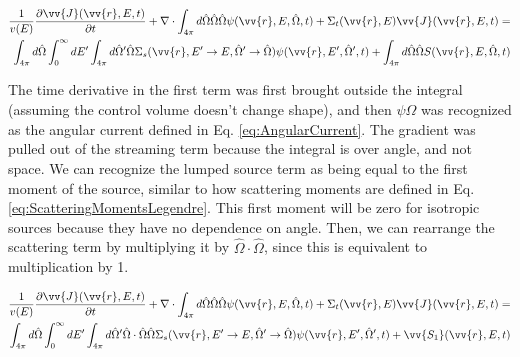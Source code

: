 \documentclass[10pt]{article}
\begin{document}
\begin{flushleft}
\begin{equation}
\label{eq:TEAngleAngleIntegrated}
\begin{aligned}
\frac{1}{v(E)} \frac{\partial\vv{J}(\vv{r}, E, t)}{\partial t} +
 \nabla\cdot \int_{4\pi}^{} d\hat{\Omega}\hat{\Omega}\hat{\Omega}\psi(\vv{r}, E, \hat{\Omega},t) + 
 \Sigma_t(\vv{r},E)\vv{J}(\vv{r}, E, t) = \\
 \int_{4\pi}^{} d\hat{\Omega} \int_{0}^{\infty}dE' \int_{4\pi}^{ } d\hat{\Omega}' \hat{\Omega}\Sigma_s(\vv{r}, E'\rightarrow E, \hat{\Omega}'\rightarrow\hat{\Omega})\psi(\vv{r}, E', \hat{\Omega}',t) + \int_{4\pi}^{} d\hat{\Omega}\hat{\Omega}S(\vv{r}, E, \hat{\Omega}, t)\\
\end{aligned}
\end{equation}

The time derivative in the first term was first brought outside the integral (assuming the control volume doesn't change shape), and then \(\psi\hat{\Omega}\) was recognized as the angular current defined in Eq. \ref{eq:AngularCurrent}. The gradient was pulled out of the streaming term because the integral is over angle, and not space. We can recognize the lumped source term as being equal to the first moment of the source, similar to how scattering moments are defined in Eq. \ref{eq:ScatteringMomentsLegendre}. This first moment will be zero for isotropic sources because they have no dependence on angle. Then, we can rearrange the scattering term by multiplying it by \(\hat{\Omega}\cdot\hat{\Omega}\), since this is equivalent to multiplication by 1.

\begin{equation}
\label{eq:TEAngleAngleIntegrated}
\begin{aligned}
\frac{1}{v(E)} \frac{\partial\vv{J}(\vv{r}, E, t)}{\partial t} +
 \nabla\cdot \int_{4\pi}^{} d\hat{\Omega} \hat{\Omega}\hat{\Omega}\psi(\vv{r}, E, \hat{\Omega},t) + 
 \Sigma_t(\vv{r},E)\vv{J}(\vv{r}, E, t) = \\
 \int_{4\pi}^{} d\hat{\Omega} \int_{0}^{\infty}dE' \int_{4\pi}^{ } d\hat{\Omega}' \hat{\Omega}\cdot\hat{\Omega} \hat{\Omega}\Sigma_s(\vv{r}, E'\rightarrow E, \hat{\Omega}'\rightarrow\hat{\Omega})\psi(\vv{r}, E', \hat{\Omega}',t) + \vv{S_1}(\vv{r}, E, t)\\
\end{aligned}
\end{equation}



\end{flushleft}
\end{document}
